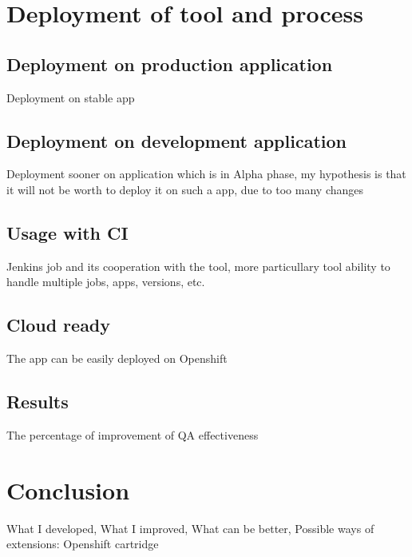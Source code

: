 \documentclass[11pt,oneside,final]{fithesis2}
\begin{document}
\chapter{Deployment of tool and process}

  \section{Deployment on production application}
  Deployment on stable app
  
  \section{Deployment on development application}
  Deployment sooner on application which is in Alpha phase, my hypothesis is that it will not be worth to deploy it on such a app, due to too many changes
  
  \section{Usage with CI}
  Jenkins job and its cooperation with the tool, more particullary tool ability to handle multiple jobs, apps, versions, etc.
  
  \section{Cloud ready}
  The app can be easily deployed on Openshift
  
  \section{Results}
  The percentage of improvement of QA effectiveness
  
\chapter{Conclusion}
What I developed, What I improved, What can be better, Possible ways of extensions: Openshift cartridge
    
\end{document}

